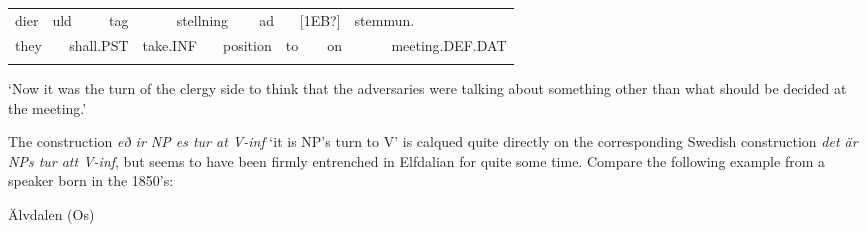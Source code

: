 \begin{tabular}{llllllllllllll}
\lsptoprule
dier & \multicolumn{2}{l}{uld

} & \multicolumn{2}{l}{tag

} & \multicolumn{2}{l}{stellning

} & \multicolumn{2}{l}{ad

} & \multicolumn{2}{l}{[1EB?]

} & \multicolumn{2}{l}{stemmun.

} & \\
\multicolumn{2}{l}{they

} & \multicolumn{2}{l}{shall.PST

} & \multicolumn{2}{l}{take.INF

} & \multicolumn{2}{l}{position

} & \multicolumn{2}{l}{to

} & \multicolumn{2}{l}{on

} & \multicolumn{2}{l}{meeting.DEF.DAT

}\\
\lspbottomrule
\end{tabular}

\begin{styleTranslation}
‘Now it was the turn of the clergy side to think that the adversaries were talking about something other than what should be decided at the meeting.’ 

\end{styleTranslation}

\begin{styleBodyTextFirst}
The construction \textit{eð ir NP es tur at V-inf} ‘it is NP’s turn to V’ is calqued quite directly on the corresponding Swedish construction \textit{det är NPs tur att V-inf}, but seems to have been firmly entrenched in Elfdalian for quite some time. Compare the following example from a speaker born in the 1850’s:

\end{styleBodyTextFirst}

\begin{listWWNumileveli}
\item 

\begin{styleExample}
\label{bkm:Ref135470154}Älvdalen (Os)

\end{styleExample}

\end{listWWNumileveli}

